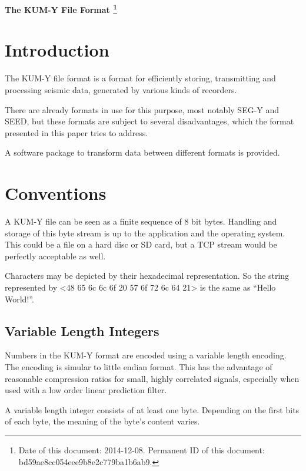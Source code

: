 \documentclass[DIV=10]{scrartcl}
\begin{document}
\strut

\vspace{1cm}

\centerline{\huge \textbf{The KUM-Y File Format%
\footnote{\raggedright Date of this document: 2014-12-08.
Permanent ID of this document: bd59ae8cc054eee9b8e2c779ba1b6ab9.}}}

\vspace{1cm}

\section{Introduction}

The KUM-Y file format is a format for efficiently storing, transmitting and processing seismic data, generated by various kinds of recorders.

There are already formats in use for this purpose, most notably SEG-Y and SEED, but these formats are subject to several disadvantages, which the format presented in this paper tries to address.

A software package to transform data between different formats is provided.

\section{Conventions}

A KUM-Y file can be seen as a finite sequence of 8 bit bytes.
Handling and storage of this byte stream is up to the application and the operating system.
This could be a file on a hard disc or SD card, but a TCP stream would be perfectly acceptable as well.

Characters may be depicted by their hexadecimal representation.
So the string represented by <48 65 6c 6c 6f 20 57 6f 72 6c 64 21> is the same as “Hello World!”.

\subsection{Variable Length Integers}
\label{varint}

Numbers in the KUM-Y format are encoded using a variable length encoding. The encoding is simular to little endian format.
This has the advantage of reasonable compression ratios for small, highly correlated signals, especially when used with a low order linear prediction filter.

A variable length integer consists of at least one byte.
Depending on the first bits of each byte, the meaning of the byte’s content varies.
\end{document}
